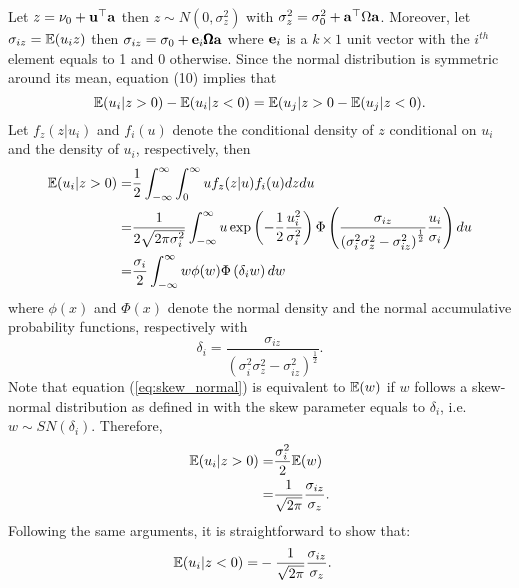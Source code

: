 \documentclass[a4paper, 11pt]{article}
\begin{document}
   
   \begin{proving} 
\noindent Let $z = \nu_0 + \mathbf{u}^\top\mathbf{a}$ then $z \sim N(0, \sigma^2_z)$ with $\sigma^2_z = \sigma^2_0 + \mathbf{a}^\top \Omega \mathbf{a}$. Moreover, let $\sigma_{iz} = \mathbb{E} (u_iz)$ then $\sigma_{iz} = \sigma_0  + \mathbf{e}_i\pmb{\Omega} \mathbf{a}$ where $\mathbf{e}_i$ is a $k\times 1$ unit vector with the $i^{th}$ element equals to 1 and 0 otherwise. Since the normal distribution is symmetric around its mean, equation (10) implies that 
\begin{equation*}
   \mathbb{E} (u_i | z > 0) - \mathbb{E} (u_i | z < 0) = \mathbb{E} (u_j | z>0 - \mathbb{E}(u_j | z< 0). 
\end{equation*} 
\noindent Let $f_z(z|u_i)$ and $f_i(u)$ denote the conditional density of $z$ conditional on $u_i$ and the density of $u_i$, respectively, then 
\begin{align}
   \mathbb{E} ( u_i | z > 0 ) =& \frac{1}{2} \int^\infty_{-\infty} \int ^\infty_0 u f_z(z|u) f_i(u) dzdu \notag \\
   =& \frac{1}{2\sqrt{2\pi \sigma_i^2}}\int^\infty_{-\infty} u \exp \left ( -\frac{1}{2} \frac{u_i^2}{\sigma^2_i} \right ) \Phi \left ( \frac{\sigma_{iz}}{\left (\sigma^2_i \sigma^2_z - \sigma^2_{iz}\right )^{\frac{1}{2}}} \frac{u_i}{\sigma_i} \right ) du\notag \\
   =& \frac{\sigma_i}{2} \int^\infty_{-\infty} w \phi(w) \Phi \left (\delta_i w \right ) dw  \label{eq:skew_normal}
\end{align}
\noindent where $\phi(x)$ and $\Phi(x)$ denote the normal density and the normal accumulative probability functions, respectively with 
\begin{equation*} 
   \delta _i = \frac{\sigma_{iz}}{\left ( \sigma^2_i \sigma^2_z - \sigma^2_{iz} \right )^{\frac{1}{2}} }.
\end{equation*} 
\noindent Note that equation (\ref{eq:skew_normal}) is equivalent to $\mathbb{E} (w)$ if $w$ follows a skew-normal distribution as defined in \cite{azzalini:1985} with the skew parameter equals to $\delta_i$, i.e. $w\sim SN(\delta_i)$. Therefore, 
\begin{align*} 
   \mathbb{E} (u_i | z > 0 ) =& \frac{\sigma^2_i}{2} \mathbb{E} (w) \\
   =& \frac{1}{\sqrt{2\pi}} \frac{\sigma_{iz}}{\sigma_z}.
\end{align*} 
Following the same arguments, it is straightforward to show that:
\begin{align*} 
   \mathbb{E} (u_i | z<0 ) =& -\frac{1}{\sqrt{2\pi}} \frac{\sigma_{iz}}{\sigma_z}. 
\end{align*} 

\end{proving}
\end{document}
